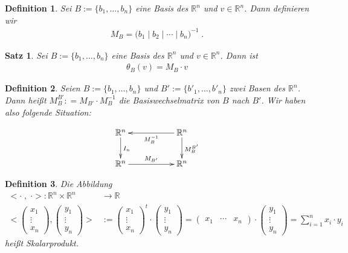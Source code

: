 \documentclass[]{article}
\newtheorem{Definition}{Definition}
\newtheorem{Satz}{Satz}
\begin{document}
\begin{Definition}
Sei $B:= \{ b_1, \hdots , b_n \}$ eine Basis des $\mathbb{R}^n$ und $v \in \mathbb{R}^n$. Dann definieren wir  
\begin{align*}
M_B  = \biggl ( b_1 \; \bigg | \;  b_2 \; \bigg | \;  \cdots  \; \bigg | \;  b_n \biggr )^{-1}   \;.
\end{align*}
\end{Definition}


\begin{Satz}
Sei $B:= \{ b_1, \hdots , b_n \}$ eine Basis des $\mathbb{R}^n$ und $v \in \mathbb{R}^n$. Dann ist 
\begin{align*}
\theta_B (v) = M_B \cdot v   
\end{align*}
\end{Satz}



\begin{Definition}
Seien $B:= \{ b_1, \hdots , b_n \}$ und $B':= \{ b'_1, \hdots , b'_n \}$ zwei Basen des $\mathbb{R}^n$.
Dann heißt $M_{B}^{B'} : = M_{B'}  \cdot M_{B}^{-1} $ die Basiswechselmatrix von $B$ nach $B'$. Wir haben also folgende Situation:

\begin{align*}
\xymatrix{
\mathbb{R}^n  \ar[d]^{I_n} &  & \ar[ll]^{M_B^{-1}} \mathbb{R}^n \ar[d]^{M_{B}^{B'}} \\
\mathbb{R}^n  \ar[rr]^{M_{B'}} & &  \mathbb{R}^n
}
\end{align*}
\end{Definition}

\begin{Definition}
Die Abbildung 
\begin{align*}
< \cdot \; , \;  \cdot > : \mathbb{R}^n \times \mathbb{R}^n & \to \mathbb{R} \\
\Biggl < \begin{pmatrix}
x_1 \\ \vdots \\ x_n
\end{pmatrix},  \begin{pmatrix}
y_1 \\ \vdots \\ y_n
\end{pmatrix}  \Biggr> & := \begin{pmatrix}
x_1 \\ \vdots \\ x_n
\end{pmatrix}^t \cdot \begin{pmatrix}
y_1 \\ \vdots \\ y_n  
\end{pmatrix}  =
\begin{pmatrix}
x_1 & \cdots & x_n
\end{pmatrix} \cdot \begin{pmatrix}
y_1 \\ \vdots \\ y_n  
\end{pmatrix} = \sum_{i=1}^n  x_i \cdot y_i
\end{align*}  
heißt Skalarprodukt.
\end{Definition}
\end{document}

